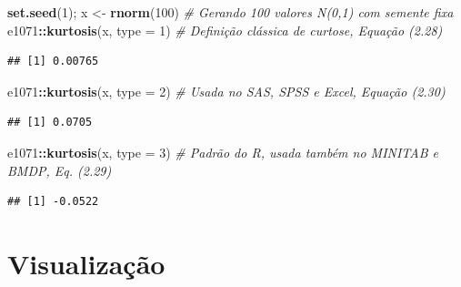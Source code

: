 \documentclass[
]{book}
\newenvironment{Shaded}{\begin{snugshade}}{\end{snugshade}}
\newcommand{\CommentTok}[1]{\textcolor[rgb]{0.56,0.35,0.01}{\textit{#1}}}
\newcommand{\DataTypeTok}[1]{\textcolor[rgb]{0.13,0.29,0.53}{#1}}
\newcommand{\DecValTok}[1]{\textcolor[rgb]{0.00,0.00,0.81}{#1}}
\newcommand{\KeywordTok}[1]{\textcolor[rgb]{0.13,0.29,0.53}{\textbf{#1}}}
\newcommand{\NormalTok}[1]{#1}
\newcommand{\OperatorTok}[1]{\textcolor[rgb]{0.81,0.36,0.00}{\textbf{#1}}}
\newcommand{\StringTok}[1]{\textcolor[rgb]{0.31,0.60,0.02}{#1}}
\theoremstyle{definition}
\theoremstyle{definition}
\theoremstyle{definition}
\theoremstyle{remark}
\begin{document}
\begin{Shaded}
\begin{Highlighting}[]
\KeywordTok{set.seed}\NormalTok{(}\DecValTok{1}\NormalTok{); x \textless{}{-}}\StringTok{ }\KeywordTok{rnorm}\NormalTok{(}\DecValTok{100}\NormalTok{)    }\CommentTok{\# Gerando 100 valores N(0,1) com semente fixa}
\NormalTok{e1071}\OperatorTok{::}\KeywordTok{kurtosis}\NormalTok{(x, }\DataTypeTok{type =} \DecValTok{1}\NormalTok{)    }\CommentTok{\# Definição clássica de curtose, Equação (2.28)}
\end{Highlighting}
\end{Shaded}

\begin{verbatim}
## [1] 0.00765
\end{verbatim}

\begin{Shaded}
\begin{Highlighting}[]
\NormalTok{e1071}\OperatorTok{::}\KeywordTok{kurtosis}\NormalTok{(x, }\DataTypeTok{type =} \DecValTok{2}\NormalTok{)    }\CommentTok{\# Usada no SAS, SPSS e Excel, Equação (2.30)}
\end{Highlighting}
\end{Shaded}

\begin{verbatim}
## [1] 0.0705
\end{verbatim}

\begin{Shaded}
\begin{Highlighting}[]
\NormalTok{e1071}\OperatorTok{::}\KeywordTok{kurtosis}\NormalTok{(x, }\DataTypeTok{type =} \DecValTok{3}\NormalTok{)    }\CommentTok{\# Padrão do R, usada também no MINITAB e BMDP, Eq. (2.29)}
\end{Highlighting}
\end{Shaded}

\begin{verbatim}
## [1] -0.0522
\end{verbatim}

\hypertarget{visualizauxe7uxe3o}{%
\section{Visualização}\label{visualizauxe7uxe3o}}
\end{document}
